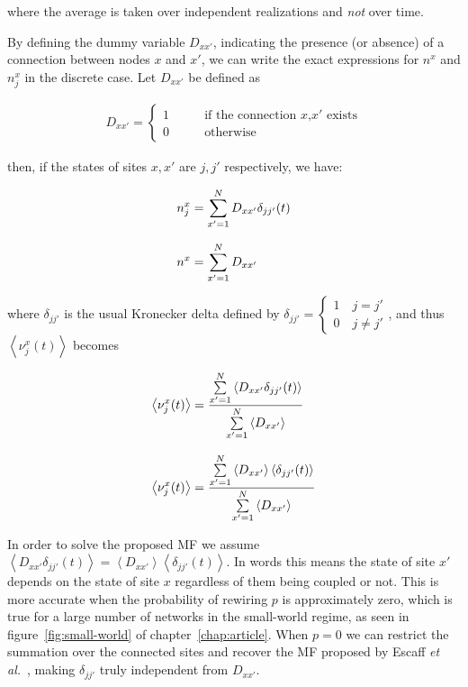 \noindent where the average is taken over independent realizations and \textit{not} over time.

By defining the dummy variable $D_{xx'}$, indicating the presence (or absence) of a connection between nodes $x$ and $x'$, we can write
the exact expressions for $n^x$ and $n^x_j$ in the discrete case. Let $D_{xx'}$ be defined as

\begin{align}
    D_{xx'} = 
    \begin{cases}
        1 \qquad &\text{if the connection $x$,$x'$ exists}\\
        0 \qquad &\text{otherwise}
    \end{cases}
\end{align}

\noindent then, if the states of sites $x,x'$ are $j,j'$ respectively, we have:

\begin{align}
    n^x_j &= \sum\limits_{x'=1}^ND_{xx'}\delta_{jj'}(t) \notag\\[8pt]
    n^x &= \sum\limits_{x'=1}^ND_{xx'}
\end{align}

\noindent where $\delta_{jj'}$ is the usual Kronecker delta defined by $\delta_{jj'}=\begin{cases}1 \quad j=j'\\0 \quad j\neq
j'\end{cases}$, and thus $\left< \nu^x_j(t) \right>$ becomes

\begin{align}
    \left< \nu^x_j(t) \right> &= \frac{\sum\limits_{x'=1}^N\left< D_{xx'}\delta_{jj'}(t)\right>}{\sum\limits_{x'=1}^N\left< D_{xx'} \right>}
    \notag \\[8pt]
    \left< \nu^x_j(t) \right> &= \frac{\sum\limits_{x'=1}^N\left< D_{xx'}\right>\left<\delta_{jj'}(t)\right>}{\sum\limits_{x'=1}^N\left< D_{xx'} \right>}
\end{align}

\noindent In order to solve the proposed MF we assume $\left< D_{xx'}\delta_{jj'}(t)\right> = \left<
D_{xx'}\right>\left<\delta_{jj'}(t)\right>$. In words this means the state of site $x'$ depends on the state of site $x$ regardless of
them being coupled or not. This is more accurate when the probability of rewiring $p$ is approximately zero, which is true for a large
number of networks in the small-world regime, as seen in figure~\ref{fig:small-world} of chapter~\ref{chap:article}. When $p=0$ we can
restrict the summation over the connected sites and recover the MF proposed by Escaff \textit{et al.}~\cite{escaff2014arrays}, making
$\delta_{jj'}$ truly independent from $D_{xx'}$.

